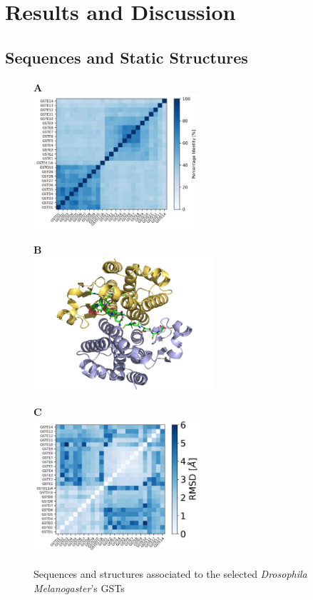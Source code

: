 \chapter{Results and Discussion}

\section{Sequences and Static Structures}

\begin{figure}[h!]
	\label{Sequence & Structure}
	\begin{minipage}{.32\linewidth}
		\textbf{A}\\
		\includegraphics[height = 5cm]{figures/PercentID_matrix.jpg} %
	\end{minipage}
	\begin{minipage}{.32\linewidth}
		\textbf{B}\\
		\includegraphics[height = 5cm]{figures/GSTD1_GSHs.png} %
	\end{minipage}
	\begin{minipage}{.32\linewidth}
		\textbf{C}\\
		\includegraphics[height = 5cm]{figures/RMSD_matrix.jpg} %
	\end{minipage}
	\caption{Sequences and structures associated to the selected \textit{Drosophila Melanogaster}'s GSTs}
\end{figure}

